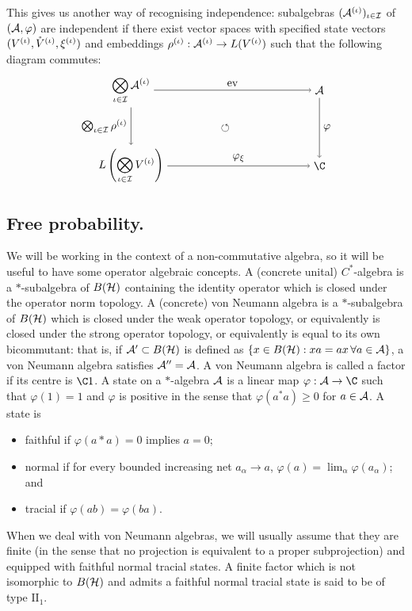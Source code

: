 This gives us another way of recognising independence: subalgebras $(\mathcal{A}^{(\iota)})_{\iota\in\mathcal{I}}$ of $(\mathcal{A}, \varphi)$ are independent if there exist vector spaces with specified state vectors $(V^{(\iota)}, \mathring{V}^{(\iota)}, \xi^{(\iota)})$ and embeddings $\rho^{(\iota)} : \mathcal{A}^{(\iota)} \to L(V^{(\iota)})$ such that the following diagram commutes:
	\[\begin{tikzpicture}
		\node (q) at (-3, 1.2) {$\displaystyle\bigotimes_{\iota\in\I}\A^{(\iota)}$};
		\node (a) at (-3, -1.2) {$L\paren{\displaystyle\bigotimes_{\iota\in\I}V^{(\iota)}}$};
		\node (w) at (3, 1.2) {$\A$};
		\node (s) at (3, -1.2) {$\C$};
		\node at (0,0) {$\circlearrowleft$};

		\draw [->] (q) -- node[above] {$\operatorname{ev}$} (w);
		\draw [->] (q) -- node[left] {$\bigotimes_{\iota\in\I}\rho^{(\iota)}$} (a);
		\draw [->] (a) -- node[above] {$\varphi_\xi$} (s);
		\draw [->] (w) -- node[right] {{$\varphi$}} (s);
	\end{tikzpicture}\]

\subsection{Free probability.}
\label{ssec:freeind}
We will be working in the context of a non-commutative algebra, so it will be useful to have some operator algebraic concepts.
A (concrete unital) $C^*$-algebra is a $*$-subalgebra of $B(\mathcal{H})$ containing the identity operator which is closed under the operator norm topology.
A (concrete) von Neumann algebra is a $*$-subalgebra of $B(\mathcal{H})$ which is closed under the weak operator topology, or equivalently is closed under the strong operator topology, or equivalently is equal to its own bicommutant: that is, if $\mathcal{A}' \subset B(\mathcal{H})$ is defined as $\left\{x \in B(\mathcal{H}) : xa = ax\,\forall a \in \mathcal{A}\right\}$, a von Neumann algebra satisfies $\mathcal{A}'' = \mathcal{A}$.
A von Neumann algebra is called a factor if its centre is $\C1$.
A state on a $*$-algebra $\mathcal{A}$ is a linear map $\varphi : \A \to \C$ such that $\varphi(1) = 1$ and $\varphi$ is positive in the sense that $\varphi(a^*a) \geq 0$ for $a \in \mathcal{A}$.
A state is
\begin{itemize}
	\item faithful if $\varphi(a*a) = 0$ implies $a = 0$;
	\item normal if for every bounded increasing net $a_\alpha \to a$, $\varphi(a) = \lim_{\alpha}\varphi(a_\alpha)$; and
	\item tracial if $\varphi(ab) = \varphi(ba)$.
\end{itemize}
When we deal with von Neumann algebras, we will usually assume that they are finite (in the sense that no projection is equivalent to a proper subprojection) and equipped with faithful normal tracial states.
A finite factor which is not isomorphic to $B(\mathcal{H})$ and admits a faithful normal tracial state is said to be of type $\mathrm{II}_1$.

